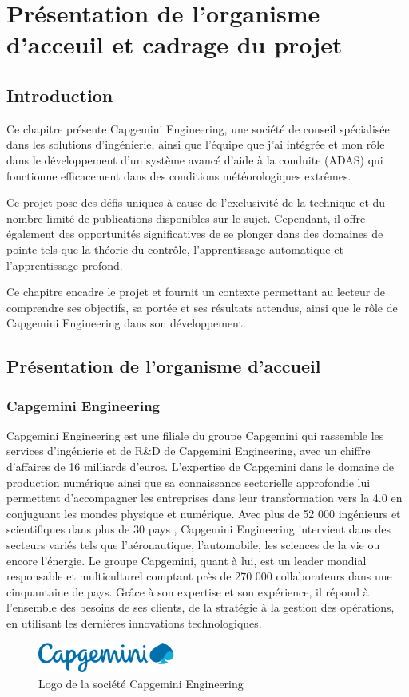 \chapter{Présentation de l'organisme d'acceuil et cadrage du projet}
\label{sec:pré}
\section{Introduction}



\medskip

Ce chapitre présente Capgemini Engineering, une société de conseil spécialisée dans les solutions d'ingénierie, ainsi que l'équipe que j'ai intégrée et mon rôle dans le développement d'un système avancé d'aide à la conduite (ADAS) qui fonctionne efficacement dans des conditions météorologiques extrêmes.

Ce projet pose des défis uniques à cause de l'exclusivité de la technique et du nombre limité de publications disponibles sur le sujet. Cependant, il offre également des opportunités significatives de se plonger dans des domaines de pointe tels que la théorie du contrôle, l'apprentissage automatique et l'apprentissage profond. 

Ce chapitre encadre le projet et fournit un contexte permettant au lecteur de comprendre ses objectifs, sa portée et ses résultats attendus, ainsi que le rôle de Capgemini Engineering dans son développement.
\medskip
\section{Présentation de l'organisme d'accueil}
\subsection{Capgemini Engineering}
Capgemini Engineering est une filiale du groupe Capgemini qui rassemble les services
d'ingénierie et de R\&D de Capgemini Engineering, avec un chiffre d'affaires de 16 milliards
d’euros. L'expertise de Capgemini dans le domaine de production numérique ainsi que sa
connaissance sectorielle approfondie lui permettent d'accompagner les entreprises dans leur
transformation vers la 4.0 en conjuguant les mondes physique et numérique. Avec plus de 52
000 ingénieurs et scientifiques dans plus de 30 pays , Capgemini Engineering intervient dans
des secteurs variés tels que l'aéronautique, l'automobile, les sciences de la vie ou encore
l'énergie. Le groupe Capgemini, quant à lui, est un leader mondial responsable et multiculturel
comptant près de 270 000 collaborateurs dans une cinquantaine de pays. Grâce à son expertise
et son expérience, il répond à l'ensemble des besoins de ses clients, de la stratégie à la gestion
des opérations, en utilisant les dernières innovations technologiques. 
\begin{figure}[hbt!]
  \centering
  \includegraphics[width=0.4\textwidth]{logo.png}
  \caption{Logo de la société Capgemini Engineering}
\end{figure}

